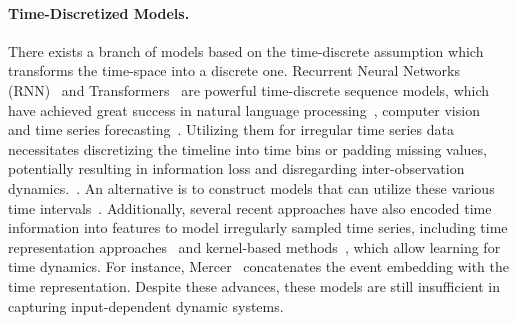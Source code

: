 \documentclass{article}
\begin{document}
\paragraph{Time-Discretized Models.} 
There exists a branch of models based on the time-discrete assumption which transforms the time-space into a discrete one.
Recurrent Neural Networks (RNN)~\cite{hochreiter1997long, chung2014empirical} and Transformers~\cite{vaswani2017attention} are powerful time-discrete sequence models, which have achieved great success in natural language processing~\cite{devlin2018bert, liu2019roberta, zhang2021continuous}, computer vision~\cite{zhu2020deformable, guo2022cmt} and time series forecasting~\cite{wu2021autoformer, zhou2021informer, li2023towards, zhou2022fedformer, kitaev2020reformer, wu2022timesnet, zeng2023transformers}. 
Utilizing them for irregular time series data necessitates discretizing the timeline into time bins or padding missing values, potentially resulting in information loss and disregarding inter-observation dynamics.~\cite{choi2018mime, mozer2017discrete, lipton2016directly}.
An alternative is to construct models that can utilize these various time intervals~\cite{zhang2019attain, li2020time}. 
Additionally, several recent approaches have also 
encoded time information into features to model irregularly sampled time series, including time representation approaches~\cite{xu2019self, zhang2019attain} and kernel-based methods~\cite{ma2022non}, which allow learning for time dynamics.
For instance, Mercer~\cite{xu2019self} concatenates the event embedding with the time representation.
Despite these advances, these models are still insufficient in capturing input-dependent dynamic systems. 
\end{document}
